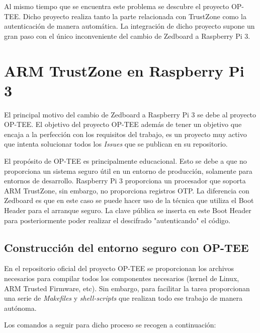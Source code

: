 Al mismo tiempo que se encuentra este problema se descubre el proyecto OP-TEE. Dicho proyecto realiza tanto la parte relacionada con TrustZone como la autenticación de manera automática. La integración de dicho proyecto supone un gran paso con el único inconveniente del cambio de Zedboard a Raspberry Pi 3.



\section{ARM TrustZone en Raspberry Pi 3}

El principal motivo del cambio de Zedboard a Raspberry Pi 3 se debe al proyecto OP-TEE. El objetivo del proyecto OP-TEE además de tener un objetivo que encaja a la perfección con los requisitos del trabajo, es un proyecto muy activo que intenta solucionar todos los \textit{Issues} que se publican en su repositorio. \newline

El propósito de OP-TEE es principalmente educacional. Esto se debe a que no proporciona un sistema seguro útil en un entorno de producción, solamente para entornos de desarrollo. Raspberry Pi 3 proporciona un procesador que soporta ARM TrustZone, sin embargo, no proporciona registros OTP. La diferencia con Zedboard es que en este caso se puede hacer uso de la técnica que utiliza el Boot Header para el arranque seguro. La clave pública se inserta en este Boot Header para posteriormente poder realizar el descifrado "autenticando" el código.

\subsection{Construcción del entorno seguro con OP-TEE}
En el repositorio oficial del proyecto OP-TEE \cite{optee} se proporcionan los archivos necesarios para compilar todos los componentes necesarios (kernel de Linux, ARM Trusted Firmware, etc). Sin embargo, para facilitar la tarea proporcionan una serie de \textit{Makefiles} y \textit{shell-scripts} que realizan todo ese trabajo de manera autónoma.\newline

Los comandos a seguir para dicho proceso se recogen a continuación:

